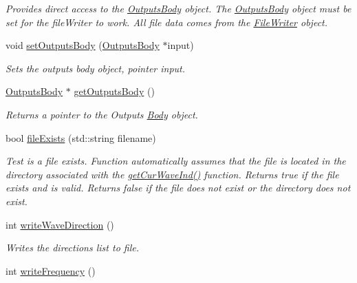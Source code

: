 \begin{DoxyCompactItemize}
\begin{DoxyCompactList}\small\item\em Provides direct access to the \hyperlink{classosea_1_1ofreq_1_1_outputs_body}{Outputs\-Body} object. The \hyperlink{classosea_1_1ofreq_1_1_outputs_body}{Outputs\-Body} object must be set for the file\-Writer to work. All file data comes from the \hyperlink{classosea_1_1ofreq_1_1_file_writer}{File\-Writer} object. \end{DoxyCompactList}\item 
void \hyperlink{classosea_1_1ofreq_1_1_file_writer_af0234f3573308ca6f5b7178f662b3993}{set\-Outputs\-Body} (\hyperlink{classosea_1_1ofreq_1_1_outputs_body}{Outputs\-Body} $\ast$input)
\begin{DoxyCompactList}\small\item\em Sets the outputs body object, pointer input. \end{DoxyCompactList}\item 
\hyperlink{classosea_1_1ofreq_1_1_outputs_body}{Outputs\-Body} $\ast$ \hyperlink{classosea_1_1ofreq_1_1_file_writer_a2794a9410be184745cd98f26df801ab2}{get\-Outputs\-Body} ()
\begin{DoxyCompactList}\small\item\em Returns a pointer to the Outputs \hyperlink{classosea_1_1ofreq_1_1_body}{Body} object. \end{DoxyCompactList}\item 
bool \hyperlink{classosea_1_1ofreq_1_1_file_writer_afc22f7afcd30f676e5385133247ed84d}{file\-Exists} (std\-::string filename)
\begin{DoxyCompactList}\small\item\em Test is a file exists. Function automatically assumes that the file is located in the directory associated with the \hyperlink{classosea_1_1ofreq_1_1_file_writer_a9748d987475a225b49e14f48b8be0cd6}{get\-Cur\-Wave\-Ind()} function. Returns true if the file exists and is valid. Returns false if the file does not exist or the directory does not exist. \end{DoxyCompactList}\item 
int \hyperlink{classosea_1_1ofreq_1_1_file_writer_af8b7b6236b90e1734161f6158f64482b}{write\-Wave\-Direction} ()
\begin{DoxyCompactList}\small\item\em Writes the directions list to file. \end{DoxyCompactList}\item 
int \hyperlink{classosea_1_1ofreq_1_1_file_writer_a99e8d1ffb93b50966735bb90d0f4e082}{write\-Frequency} ()

\end{DoxyCompactItemize}
